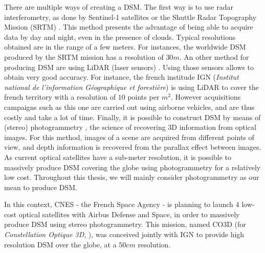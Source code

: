 There are multiple ways of creating a DSM. The first way is to use radar interferometry, as done by Sentinel-1 satellites \cite{geudtner_sentinel-1_2014} or the Shuttle Radar Topography Mission (SRTM) \cite{farr_shuttle_2007}. This method presents the advantage of being able to acquire data by day and night, even in the presence of clouds. Typical resolutions obtained are in the range of a few meters. For instances, the worldwide DSM produced by the SRTM mission has a resolution of $30m$. An other method for producing DSM are using LiDAR (laser sensors) \cite{khosravipour_generating_2016}. Using those sensors allows to obtain very good accuracy. For instance, the french institude IGN (\textit{Institut national de l'information Géographique et forestière}) is using LiDAR to cover the french territory with a resolution of $10$ points per $m^2$. However acquisitions campaigns such as this one are carried out using airborne vehicles, and are thus costly and take a lot of time. Finally, it is possible to construct DSM by means of (stereo) photogrammetry \cite{tao_comprehensive_2001}, \ie the science of recovering 3D information from optical images. For this method, images of a scene are acquired from different points of view, and depth information is recovered from the parallax effect between images. As current optical satellites have a sub-meter resolution, it is possible to massively produce DSM covering the globe using photogrammetry for a relatively low cost. Throughout this thesis, we will mainly consider photogrammetry as our mean to produce DSM.

In this context, CNES - the French Space Agency - is planning to launch 4 low-cost optical satellites with Airbus Defense and Space, in order to massively produce DSM using stereo photogrammetry. This mission, named CO3D (for \textit{Constellation Optique 3D}, \cite{melet_co3d_2020}), was conceived jointly with IGN to provide high resolution DSM over the globe, at a $50cm$ resolution.

